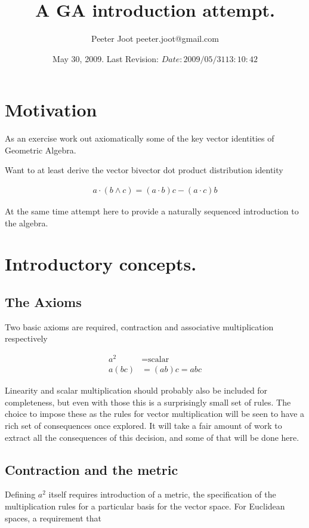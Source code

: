 \documentclass{article}
\title{ A GA introduction attempt. }
\author{Peeter Joot \quad peeter.joot@gmail.com }
\date{ May 30, 2009.  Last Revision: $Date: 2009/05/31 13:10:42 $ }
\begin{document}
\maketitle{}
\tableofcontents

\section{ Motivation }

As an exercise work out axiomatically some of the key vector identities of Geometric Algebra.

Want to at least derive the vector bivector dot product distribution
identity

\begin{align}
a \cdot ( b \wedge c) = (a \cdot b) c - (a \cdot c) b
\end{align}

At the same time attempt here to provide a naturally sequenced introduction to the algebra.

\section{ Introductory concepts. }

\subsection{ The Axioms }

Two basic axioms are required, contraction and associative multiplication respectively

\begin{align}
a^2 &= \text{scalar} \\
a (b c) &= (a b) c = a b c
\end{align}

Linearity and scalar multiplication should probably also be included for completeness, but even with those this is a surprisingly small set of rules.  The choice to impose these as the rules for vector multiplication will be seen to have a rich set of consequences once explored.  It will take a fair amount of work to extract all the consequences of this decision, and some of that will be done here.

\subsection{ Contraction and the metric }

Defining $a^2$ itself requires introduction of a metric, the specification of the multiplication rules for a particular basis for the vector space.  For Euclidean spaces, a requirement that
\end{document}
